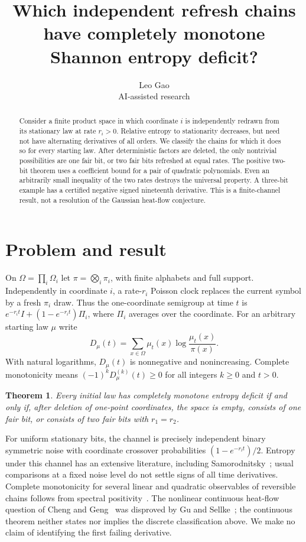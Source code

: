 \documentclass[11pt]{article}
\title{Which independent refresh chains have completely monotone Shannon entropy deficit?}
\author{Leo Gao\\{\small AI-assisted research}}
\date{}
\newtheorem{theorem}{Theorem}
\begin{document}
\maketitle
\begin{abstract}
Consider a finite product space in which coordinate $i$ is independently
redrawn from its stationary law at rate $r_i>0$. Relative entropy to
stationarity decreases, but need not have alternating derivatives of all
orders. We classify the chains for which it does so for every starting law.
After deterministic factors are deleted, the only nontrivial possibilities
are one fair bit, or two fair bits refreshed at equal rates.
The positive two-bit theorem uses a coefficient bound for a pair of
quadratic polynomials. Even an arbitrarily small inequality of the two rates
destroys the universal property. A three-bit example has a certified
negative signed nineteenth derivative. This is a finite-channel result,
not a resolution of the Gaussian heat-flow conjecture.
\end{abstract}
\section{Problem and result}
On $\Omega=\prod_i\Omega_i$ let $\pi=\bigotimes_i\pi_i$, with finite
alphabets and full support. Independently in coordinate $i$, a rate-$r_i$
Poisson clock replaces the current symbol by a fresh $\pi_i$ draw. Thus the
one-coordinate semigroup at time $t$ is
$e^{-r_it}I+(1-e^{-r_it})\Pi_i$, where $\Pi_i$ averages over the coordinate.
For an arbitrary starting law $\mu$ write
\[
 D_\mu(t)=\sum_{x\in\Omega}\mu_t(x)\log\frac{\mu_t(x)}{\pi(x)}.
\]
With natural logarithms, $D_\mu(t)$ is nonnegative and nonincreasing.
Complete monotonicity means $(-1)^kD_\mu^{(k)}(t)\ge0$ for all integers
$k\ge0$ and $t>0$.
\begin{theorem}\label{class}
Every initial law has completely monotone entropy deficit if and only if,
after deletion of one-point coordinates, the space is empty, consists of
one fair bit, or consists of two fair bits with $r_1=r_2$.
\end{theorem}
For uniform stationary bits, the channel is precisely independent binary
symmetric noise with coordinate crossover probabilities $(1-e^{-r_it})/2$.
Entropy under this channel has an extensive literature, including
Samorodnitsky~\cite{sam}; usual comparisons at a fixed noise level do not
settle signs of all time derivatives. Complete monotonicity for several
linear and quadratic observables of reversible chains follows from spectral
positivity~\cite{af}. The nonlinear continuous heat-flow question of
Cheng and Geng~\cite{cg} was disproved by Gu and Sellke~\cite{gs}; the
continuous theorem neither states nor implies the discrete classification
above. We make no claim of identifying the first failing derivative.
\end{document}
